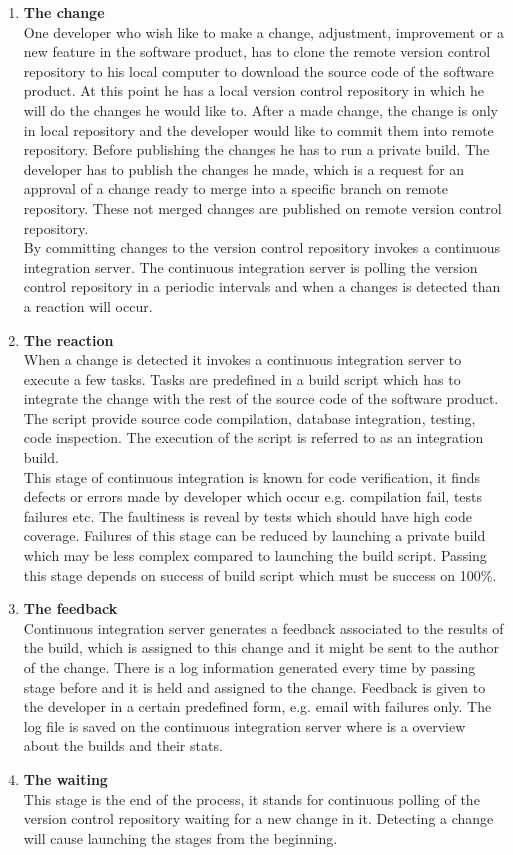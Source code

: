 \begin{enumerate}
	\item \textbf{The change}\\
		  One developer who wish like to make a change, adjustment, improvement or a new feature in the software product, has to clone the remote version control repository to his local computer to download the source code of the software product. At this point he has a local version control repository in which he will do the changes he would like to. After a made change, the change is only in local repository and the developer would like to commit them into remote repository. Before publishing the changes he has to run a private build. The developer has to publish the changes he made, which is a request for an approval of a change ready to merge into a specific branch on remote repository. These not merged changes are published on remote version control repository.\\
		  By committing changes to the version control repository invokes a continuous integration server. The continuous integration server is polling the version control repository in a periodic intervals and when a changes is detected than a reaction will occur.
	\item \textbf{The reaction}\\
		  When a change is detected it invokes a continuous integration server to execute a few tasks. Tasks are predefined in a build script which has to integrate the change with the rest of the source code of the software product. The script provide source code compilation, database integration, testing, code inspection. The execution of the script is referred to as an integration build.\\
		  This stage of continuous integration is known for code verification, it finds defects or errors made by developer which occur e.g. compilation fail, tests failures etc. The faultiness is reveal by tests which should have high code coverage. Failures of this stage can be reduced by launching a private build which may be less complex compared to launching the build script. Passing this stage depends on success of build script which must be success on 100\%.
	\item \textbf{The feedback}\\
		  Continuous integration server generates a feedback associated to the results of the build, which is assigned to this change and it might be sent to the author of the change. There is a log information generated every time by passing stage before and it is held and assigned to the change. Feedback is given to the developer in a certain predefined form, e.g. email with failures only. The log file is saved on the continuous integration server where is a overview about the builds and their stats.
	\item \textbf{The waiting}\\
		  This stage is the end of the process, it stands for continuous polling of  the version control repository waiting for a new change in it. Detecting a change will cause launching the stages from the beginning.
\end{enumerate}

